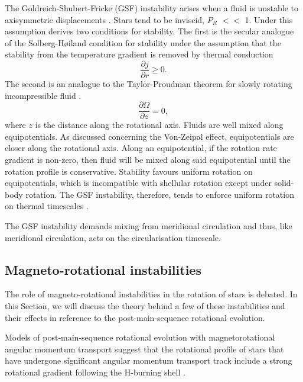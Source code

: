 The Goldreich-Shubert-Fricke (GSF) instability arises when a fluid is unstable to axisymmetric displacements \citep{goldreich_differential_1967,fricke_rotation_1967}.
Stars tend to be inviscid, $P_R$ $<<$ 1.
Under this assumption \citet{kippenhahn_rotation_1970} derives two conditions for stability.
The first is the secular analogue of the Solberg-H\o iland condition for stability under the assumption that the stability from the temperature gradient is removed by thermal conduction
\begin{equation}
    \frac{\partial j}{\partial r} \geq 0.
\end{equation}
The second is an analogue to the Taylor-Proudman theorem for slowly rotating incompressible fluid \citet{kippenhahn_circulation_1974,tassoul_theory_1978, heger_presupernova_2000}.
\begin{equation}
    \frac{\partial \Omega}{\partial z} = 0,
\end{equation}
where $z$ is the distance along the rotational axis.
Fluids are well mixed along equipotentials.
As discussed concerning the Von-Zeipal effect, equipotentials are closer along the rotational axis.
Along an equipotential, if the rotation rate gradient is non-zero, then fluid will be mixed along said equipotential until the rotation profile is conservative.
Stability favours uniform rotation on equipotentials, which is incompatible with shellular rotation except under solid-body rotation.
The GSF instability, therefore, tends to enforce uniform rotation on thermal timescales \citep{endal_evolution_1978}.

The GSF instability demands mixing from meridional circulation and thus, like meridional circulation, acts on the circularisation timescale.

\subsection{Magneto-rotational instabilities}
\label{sec:magneto_rotational_instabilities}

The role of magneto-rotational instabilities in the rotation of stars is debated.
In this Section, we will discuss the theory behind a few of these instabilities and their effects in reference to the post-main-sequence rotational evolution.

Models of post-main-sequence rotational evolution with magnetorotational angular momentum transport suggest that the rotational profile of stars that have undergone significant angular momentum transport track include a strong rotational gradient following the H-burning shell \citep{fuller_slowing_2019,moyano_asteroseismology_2022}.

